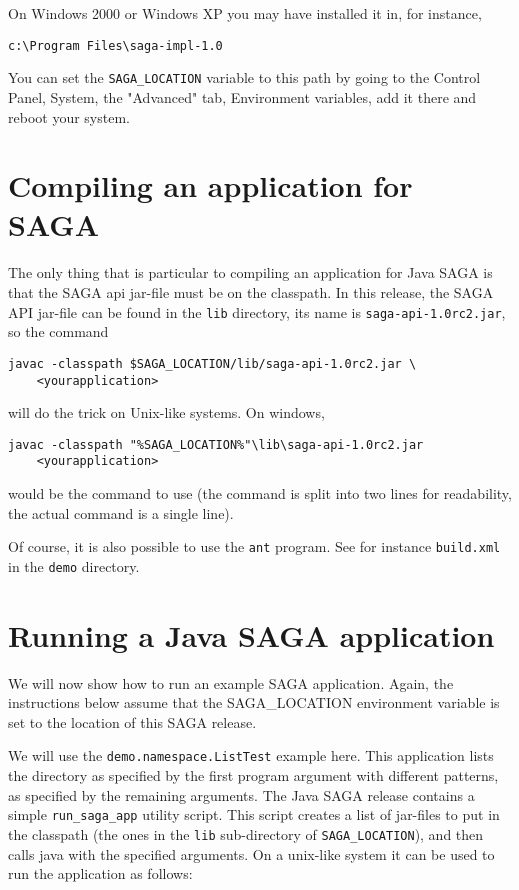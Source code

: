 \documentclass[a4paper,10pt]{article}
\begin{document}
On Windows 2000 or Windows XP you may have installed it in, for instance,
\noindent
{\small
\begin{verbatim}
c:\Program Files\saga-impl-1.0
\end{verbatim}
}
\noindent
You can set the \texttt{SAGA\_LOCATION} variable to this path by going to the
Control Panel, System, the "Advanced" tab, Environment variables,
add it there and reboot your system.

\section{Compiling an application for SAGA}

The only thing that is particular to compiling an application for
Java SAGA is that the SAGA api jar-file must be on the classpath.
In this release, the SAGA API jar-file can be found
in the \texttt{lib} directory, its name is \texttt{saga-api-1.0rc2.jar}, so
the command
\noindent
{\small
\begin{verbatim}
javac -classpath $SAGA_LOCATION/lib/saga-api-1.0rc2.jar \
    <yourapplication>
\end{verbatim}
}
\noindent
will do the trick on Unix-like systems. On windows,
\noindent
{\small
\begin{verbatim}
javac -classpath "%SAGA_LOCATION%"\lib\saga-api-1.0rc2.jar
    <yourapplication>
\end{verbatim}
}
\noindent
would be the command to use (the command is split into two lines for
readability, the actual command is a single line).

Of course, it is also possible to use the \texttt{ant} program.
See for instance \texttt{build.xml} in the \texttt{demo} directory.

\section{Running a Java SAGA application}

We will now show how to run an example SAGA application.
Again, the instructions below assume that the SAGA\_LOCATION
environment variable is set to the location of this SAGA release.

We will use the \texttt{demo.namespace.ListTest} example here.
This application lists the directory as specified by the first
program argument with different patterns, as specified by the
remaining arguments.
The Java SAGA release contains a simple \texttt{run\_saga\_app} utility script.
This script creates a list of jar-files to put in the classpath (the
ones in the \texttt{lib} sub-directory of \texttt{SAGA\_LOCATION}),
and then calls java with the specified arguments.
On a unix-like system it can be used to run the application as follows:
\end{document}
